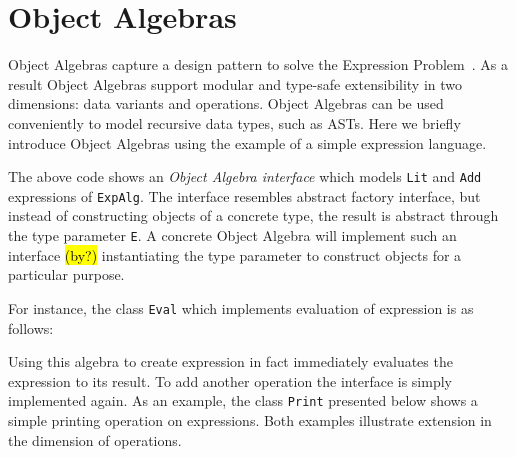\section{Object Algebras}\label{subsec:ObjectAlgebras}

Object Algebras capture a design pattern to solve the Expression Problem~\cite{wadler98expression-problem}.
As a result Object Algebras support modular and type-safe extensibility in two dimensions:
data variants and operations. Object Algebras can be used conveniently to model recursive data types, such as ASTs. Here we briefly introduce Object Algebras using the example of a simple expression language.


The above code shows an \emph{Object Algebra interface} which models \lstinline{Lit} and \lstinline{Add} expressions of \lstinline{ExpAlg}. The interface resembles abstract factory interface, but instead of constructing objects of a concrete type, the result is abstract through the type parameter \lstinline{E}.
A concrete Object Algebra will implement such an interface \hl{(by?)} instantiating the type parameter to construct objects for a particular purpose.

For instance, the class \lstinline{Eval} which implements evaluation of expression is as follows:


Using this algebra to create expression in fact immediately evaluates the expression to its result.
To add another operation the interface is simply implemented again. As an example, the class \lstinline{Print} presented below shows a simple printing operation on expressions. Both examples illustrate extension in the dimension of operations.



